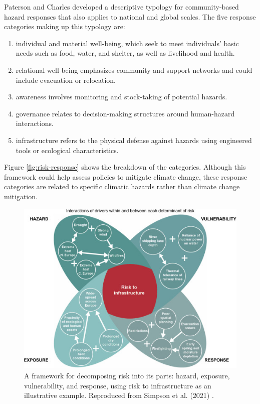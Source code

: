 Paterson and
Charles \cite{paterson_community-based_2019} developed a descriptive typology
for community-based hazard responses that also applies to national and global
scales. The five response categories making up this typology are:
\cite{paterson_community-based_2019}
\begin{enumerate}
    \item individual and material well-being, which seek to meet individuals'
    basic needs such as food, water, and shelter, as well as livelihood and
    health.
    \item relational well-being emphasizes community and support networks and
    could include evacuation or relocation.
    \item awareness involves monitoring and stock-taking of potential hazards.
    \item governance relates to decision-making structures around human-hazard
    interactions.
    \item infrastructure refers to the physical defense against hazards using
    engineered tools or ecological characteristics.
\end{enumerate} 
Figure \ref{fig:risk-response} shows the breakdown of the categories. Although
this framework could help assess policies to mitigate climate change, these
response categories are related to specific climatic hazards rather than climate
change mitigation.


\begin{figure}
    \centering
    \includegraphics{figures/simpson-risk-framework.jpg}
    \caption{A framework for decomposing risk into its parts: hazard, exposure,
    vulnerability, and response, using risk to infrastructure as an illustrative
    example. Reproduced from Simpson et al. (2021)
    \cite{simpson_framework_2021}.}
    \label{fig:risk-framework}
\end{figure}

